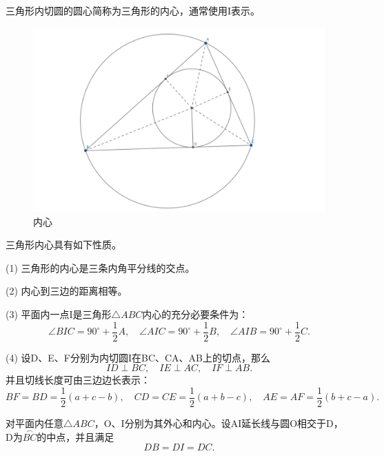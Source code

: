 \begin{definition}[内心]
    三角形内切圆的圆心简称为三角形的内心，通常使用I表示。
\end{definition}

\begin{figure}[ht]
    \centering
    \includegraphics[width=\linewidth]{figures/内心.png}
    \caption{内心}
\end{figure}

\begin{proposition}[内心性质]
    三角形内心具有如下性质。
    
    (1) 三角形的内心是三条内角平分线的交点。

    (2) 内心到三边的距离相等。

    (3) 平面内一点I是三角形$\triangle ABC$内心的充分必要条件为：
    $$\angle BIC = 90^\circ +\frac{1}{2}A,\quad \angle AIC = 90^\circ +\frac{1}{2}B,
    \quad \angle AIB =90^\circ +\frac{1}{2}C.$$

    (4) 设D、E、F分别为内切圆I在BC、CA、AB上的切点，那么
    $$
    ID \perp BC,\quad 
    IE \perp AC, \quad 
    IF \perp AB.$$
    并且切线长度可由三边边长表示：
    $$
    BF=BD=\frac{1}{2}(a+c - b),\quad 
    CD=CE=\frac{1}{2}(a+b - c),\quad 
    AE=AF=\frac{1}{2}(b+c - a).
    $$
\end{proposition}


\begin{theorem}[鸡爪定理]
    对平面内任意$\triangle ABC$，O、I分别为其外心和内心。设AI延长线与圆O相交于D，
    D为$\overset{{\frown}}{BC}$的中点，并且满足
    $$DB=DI=DC.$$
\end{theorem}

